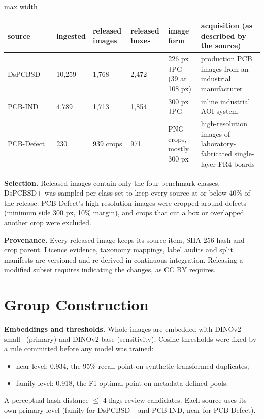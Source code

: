 \documentclass[11pt]{article}
\begin{document}
\begin{table}[htbp]\centering\small
\begin{adjustbox}{max width=\linewidth}
\begin{tabular}{llllll}
\toprule
source & ingested & released images & released boxes & image form & acquisition (as described by the source) \\ \midrule
DsPCBSD+~\cite{lv2024dspcbsd} & 10,259 & 1,768 & 2,472 & 226 px JPG (39 at 108 px) & production PCB images from an industrial manufacturer \\
PCB-IND~\cite{yan2026pcbind} & 4,789 & 1,713 & 1,854 & 300 px JPG & inline industrial AOI system \\
PCB-Defect~\cite{rashid2025pcbdefect} & 230 & 939 crops & 971 & PNG crops, mostly 300 px & high-resolution images of laboratory-fabricated single-layer FR4 boards \\
\bottomrule
\end{tabular}
\end{adjustbox}
\end{table}
\textbf{Selection.} Released images contain only the four benchmark classes. DsPCBSD+ was sampled per class set to keep every source at or below 40\% of the release. PCB-Defect's high-resolution images were cropped around defects (minimum side 300 px, 10\% margin), and crops that cut a box or overlapped another crop were excluded.

\textbf{Provenance.} Every released image keeps its source item, SHA-256 hash and crop parent. Licence evidence, taxonomy mappings, label audits and split manifests are versioned and re-derived in continuous integration. Releasing a modified subset requires indicating the changes, as CC BY requires.

\section{Group Construction}
\textbf{Embeddings and thresholds.} Whole images are embedded with DINOv2-small~\cite{oquab2024dinov2} (primary) and DINOv2-base (sensitivity). Cosine thresholds were fixed by a rule committed before any model was trained:

\begin{itemize}
\item near level: 0.934, the 95\%-recall point on synthetic transformed duplicates;
\item family level: 0.918, the F1-optimal point on metadata-defined pools.
\end{itemize}
A perceptual-hash distance $\leq$ 4 flags review candidates. Each source uses its own primary level (family for DsPCBSD+ and PCB-IND, near for PCB-Defect).
\end{document}
